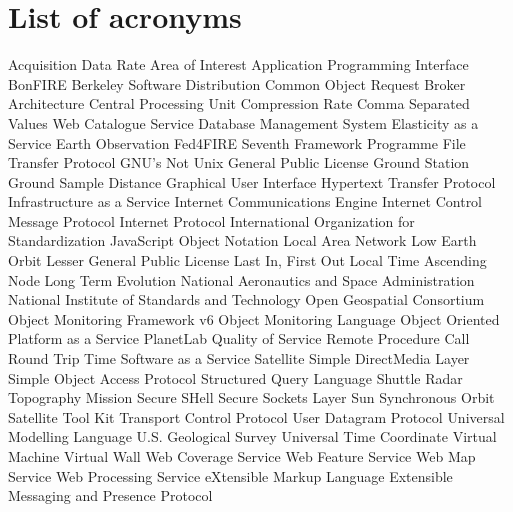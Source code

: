 \chapter{List of acronyms}

{\small
\begin{acronym}[XXXXXXXX]
     {Acquisition Data Rate}
      {Area of Interest}
   {Application Programming Interface}
       {BonFIRE}
   {Berkeley Software Distribution}
   {Common Object Request Broker Architecture}
     {Central Processing Unit}
      {Compression Rate}
     {Comma Separated Values}
       {Web Catalogue Service}
    {Database Management System}
    {Elasticity as a Service}
   {Earth Observation}
       {Fed4FIRE}
   {Seventh Framework Programme}
     {File Transfer Protocol}
       {\acs{GNU}'s Not Unix}
   {General Public License}
      {Ground Station}
   {Ground Sample Distance}
   {Graphical User Interface}
    {Hypertext Transfer Protocol}
   {Infrastructure as a Service}
   {Internet Communications Engine}
   {Internet Control Message Protocol}
   {Internet Protocol}
   {International Organization for Standardization}
   {JavaScript Object Notation}
   {Local Area Network}
   {Low Earth Orbit}
   {Lesser General Public License}
    {Last In, First Out}
   {Local Time Ascending Node}
   {Long Term Evolution}
   {National Aeronautics and Space Administration}
   {National Institute of Standards and Technology}
   {Open Geospatial Consortium}
   {Object Monitoring Framework v6}
   {Object Monitoring Language}
        {Object Oriented}
   {Platform as a Service}
      {PlanetLab}
   {Quality of Service}
       {Remote Procedure Call}
   {Round Trip Time}
   {Software as a Service}
     {Satellite}
   {Simple DirectMedia Layer}
   {Simple Object Access Protocol}
     {Structured Query Language}
   {Shuttle Radar Topography Mission}
   {Secure SHell}
   {Secure Sockets Layer}
   {Sun Synchronous Orbit}
     {Satellite Tool Kit}
   {Transport Control Protocol}
   {User Datagram Protocol}
     {Universal Modelling Language}
   {U.S. Geological Survey}
     {Universal Time Coordinate}
      {Virtual Machine}
      {Virtual Wall}
   {Web Coverage Service}
   {Web Feature Service}
   {Web Map Service}
   {Web Processing Service}
      {eXtensible Markup Language}
   {Extensible Messaging and Presence Protocol}
\end{acronym}
}



